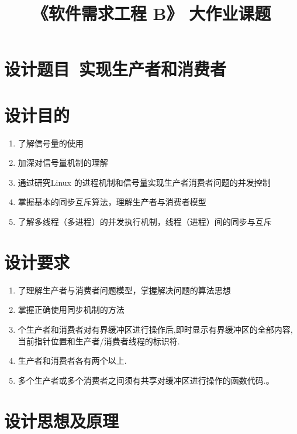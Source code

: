 \documentclass[withoutpreface,bwprint]{cumcmthesis} %
\title{《软件需求工程 B》 大作业课题}
\begin{document}
 
 
\newpage

\newpage

\section*{设计题目\ 实现生产者和消费者}

\section{设计目的}
\begin{enumerate}
\item 了解信号量的使用 
\item 加深对信号量机制的理解  
\item 通过研究Linux 的进程机制和信号量实现生产者消费者问题的并发控制
\item 掌握基本的同步互斥算法，理解生产者与消费者模型  
\item 了解多线程（多进程）的并发执行机制，线程（进程）间的同步与互斥
\end{enumerate}

\section{设计要求}

\begin{enumerate}
\item 了理解生产者与消费者问题模型，掌握解决问题的算法思想 
\item 掌握正确使用同步机制的方法      
\item 个生产者和消费者对有界缓冲区进行操作后,即时显示有界缓冲区的全部内容,当前指针位置和生产者/消费者线程的标识符.          
\item 生产者和消费者各有两个以上.      
\item 多个生产者或多个消费者之间须有共享对缓冲区进行操作的函数代码.。
\end{enumerate}

\section{设计思想及原理}
\end{document}
